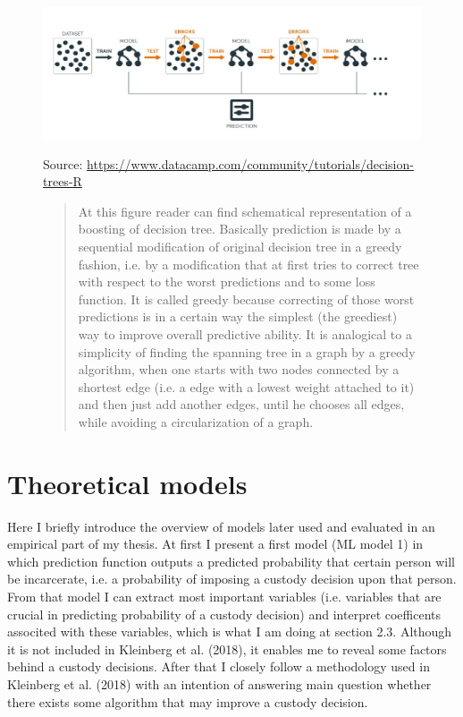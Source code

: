 \documentclass[12pt, twoside]{book} %
\begin{document}
\begin{figure}[H]
\includegraphics[width=\textwidth]{boosting_scheme.jpg}
{\small Source: \url{https://www.datacamp.com/community/tutorials/decision-trees-R} \newline
 \begin{quotation}
At this figure reader can find schematical representation of a boosting of decision tree. Basically prediction is made by a sequential modification of original decision tree in a greedy fashion, i.e. by a modification that at first tries to correct tree with respect to the worst predictions and to some loss function. It is called greedy because correcting of those worst predictions is in a certain way the simplest (the greediest) way to improve overall predictive ability. It is analogical to a simplicity of finding the spanning tree in a graph by a greedy algorithm, when one starts with two nodes connected by a shortest edge (i.e. a edge with a lowest weight attached to it) and then just add another edges, until he chooses all edges, while avoiding a circularization of a graph.
\end{quotation}
 }
\end{figure}


\newpage
\section{Theoretical models}    %
Here I briefly introduce the overview of models later used and evaluated in an empirical part of my thesis. At first I present a first model (ML model 1) in which prediction function outputs a predicted probability that certain person will be incarcerate, i.e. a probability of imposing a custody decision upon that person. From that model I can extract most important variables (i.e. variables that are crucial in predicting probability of a custody decision) and interpret coefficents associted with these variables, which is what I am doing at section 2.3. Although it is not included in Kleinberg et al. (2018), it enables me to reveal some factors behind a custody decisions. After that I closely follow a methodology used in Kleinberg et al. (2018) with an intention of answering main question whether there exists some algorithm that may improve a custody decision.
\end{document}
